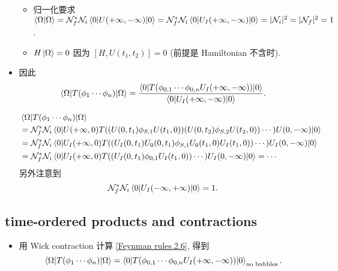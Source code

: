 \begin{itemize}
	\begin{itemize}
		\item 归一化要求 $\braket{\Omega | \Omega} = \mathcal{N}^*_f \mathcal{N}_i \braket{0 | U(+ \infty, - \infty) | 0} = \mathcal{N}^*_f \mathcal{N}_i \braket{0 | U_I(+ \infty, - \infty) | 0} = |\mathcal{N}_i|^2 = |\mathcal{N}_f|^2 = 1$.
		
		\item $H \ket{\Omega} = 0$ 因为 $[H, U(t_1, t_2)] = 0$ (前提是 Hamiltonian 不含时).
	\end{itemize}
	
	\item 因此
	\begin{equation} \label{Feynman rules.2.6}
		\braket{\Omega | T(\phi_1 \cdots \phi_n) | \Omega} = \frac{\braket{0 | T(\phi_{0, 1} \cdots \phi_{0, n} U_I(+ \infty, - \infty)) | 0}}{\braket{0 | U_I(+ \infty, - \infty) | 0}}.
	\end{equation}
	
	\begin{tcolorbox}[title=calculation:]
		\begin{align}
			& \braket{\Omega | T(\phi_1 \cdots \phi_n) | \Omega} \notag \\
			&= \mathcal{N}^*_f \mathcal{N}_i \braket{0 | U(+ \infty, 0) T((U(0, t_1) \phi_{S, 1} U(t_1, 0)) (U(0, t_2) \phi_{S, 2} U(t_2, 0)) \cdots) U(0, - \infty) | 0} \notag \\
			&= \mathcal{N}^*_f \mathcal{N}_i \braket{0 | U_I(+ \infty, 0) T((U_I(0, t_1) U_0(0, t_1) \phi_{S, 1} U_0(t_1, 0) U_I(t_1, 0)) \cdots) U_I(0, - \infty) | 0} \notag \\
			&= \mathcal{N}^*_f \mathcal{N}_i \braket{0 | U_I(+ \infty, 0) T((U_I(0, t_1) \phi_{0, 1} U_I(t_1, 0)) \cdots) U_I(0, - \infty) | 0} = \cdots
		\end{align}
		另外注意到
		\begin{equation}
			\mathcal{N}^*_f \mathcal{N}_i \braket{0 | U_I(- \infty, + \infty) | 0} = 1.
		\end{equation}
	\end{tcolorbox}
\end{itemize}

\subsection{time-ordered products and contractions}
\begin{itemize}
	\item 用 Wick contraction 计算 \eqref{Feynman rules.2.6}, 得到
	\begin{equation}
		\braket{\Omega | T(\phi_1 \cdots \phi_n) | \Omega} = \braket{0 | T(\phi_{0, 1} \cdots \phi_{0, n} U_I(+ \infty, - \infty)) | 0}_\text{no bubbles}.
	\end{equation}
\end{itemize}

